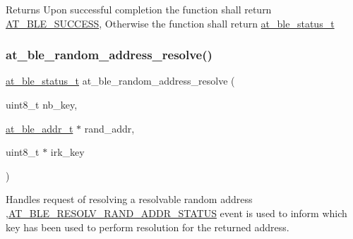 \begin{DoxyReturn}{Returns}
Upon successful completion the function shall return \mbox{\hyperlink{group__error__codes__group_gga3b1db9b95feb157b3c188ca27fe76988a7e3bfff5387331cd4f2c56cbcbbd7e19}{A\+T\+\_\+\+B\+L\+E\+\_\+\+S\+U\+C\+C\+E\+SS}}, Otherwise the function shall return \mbox{\hyperlink{at__ble__api_8h_ace24eb4e5ca3f325c663b809da5feb92}{at\+\_\+ble\+\_\+status\+\_\+t}} 
\end{DoxyReturn}
\mbox{\label{group__gap__addr__mgmt__group_ga74bf064bb0ddf4a507013c844089088f}} 
\subsubsection{\texorpdfstring{at\_ble\_random\_address\_resolve()}{at\_ble\_random\_address\_resolve()}}
{\footnotesize\ttfamily \mbox{\hyperlink{group__error__codes__group_ga3b1db9b95feb157b3c188ca27fe76988}{at\+\_\+ble\+\_\+status\+\_\+t}} at\+\_\+ble\+\_\+random\+\_\+address\+\_\+resolve (\begin{DoxyParamCaption}\item[{uint8\+\_\+t}]{nb\+\_\+key,  }\item[{\mbox{\hyperlink{structat__ble__addr__t}{at\+\_\+ble\+\_\+addr\+\_\+t}} $\ast$}]{rand\+\_\+addr,  }\item[{uint8\+\_\+t $\ast$}]{irk\+\_\+key }\end{DoxyParamCaption})}



Handles request of resolving a resolvable random address ,\mbox{\hyperlink{at__ble__api_8h_a3324640b95f33169515f89738ed5baeba1b84638285f1a4f393f5c057fadfe440}{A\+T\+\_\+\+B\+L\+E\+\_\+\+R\+E\+S\+O\+L\+V\+\_\+\+R\+A\+N\+D\+\_\+\+A\+D\+D\+R\+\_\+\+S\+T\+A\+T\+US}} event is used to inform which key has been used to perform resolution for the returned address. 


